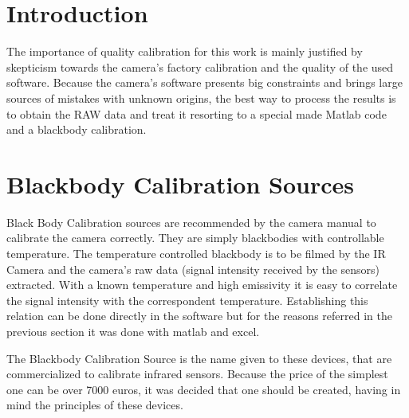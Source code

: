 \section{Introduction}
\par The importance of quality calibration for this work is mainly justified by skepticism towards the camera's factory calibration and the quality of the used software. Because the camera's software presents big constraints and brings large sources of mistakes with unknown origins, the best way to process the results is to obtain the RAW data and treat it resorting to a special made Matlab code and a blackbody calibration. \\
\section{Blackbody Calibration Sources}
\par Black Body Calibration sources are recommended by the camera manual to calibrate the camera correctly. They are simply blackbodies with controllable temperature. The temperature controlled blackbody is to be filmed by the IR Camera and the camera's raw data (signal intensity received by the sensors) extracted. With a known temperature and high emissivity it is easy to correlate the signal intensity with the correspondent temperature. Establishing this relation can be done directly in the software but for the reasons referred in the previous section it was done with matlab and excel.\\

\par The Blackbody Calibration Source is the name given to these devices, that are commercialized to calibrate infrared sensors. Because the price of the simplest one can be over 7000 euros, it was decided that one should be created, having in mind the principles of these devices. \\

